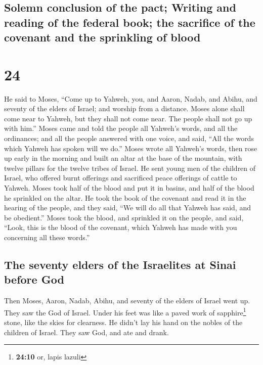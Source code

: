 \hypertarget{solemn-conclusion-of-the-pact-writing-and-reading-of-the-federal-book-the-sacrifice-of-the-covenant-and-the-sprinkling-of-blood}{%
\subsection{Solemn conclusion of the pact; Writing and reading of the
federal book; the sacrifice of the covenant and the sprinkling of
blood}\label{solemn-conclusion-of-the-pact-writing-and-reading-of-the-federal-book-the-sacrifice-of-the-covenant-and-the-sprinkling-of-blood}}

\hypertarget{section-23}{%
\section{24}\label{section-23}}

 He said to Moses, ``Come up to Yahweh, you, and Aaron,
Nadab, and Abihu, and seventy of the elders of Israel; and worship from
a distance.  Moses alone shall come near to Yahweh, but
they shall not come near. The people shall not go up with him.''
 Moses came and told the people all Yahweh's words, and
all the ordinances; and all the people answered with one voice, and
said, ``All the words which Yahweh has spoken will we do.''
 Moses wrote all Yahweh's words, then rose up early in the
morning and built an altar at the base of the mountain, with twelve
pillars for the twelve tribes of Israel.  He sent young
men of the children of Israel, who offered burnt offerings and
sacrificed peace offerings of cattle to Yahweh.  Moses
took half of the blood and put it in basins, and half of the blood he
sprinkled on the altar.  He took the book of the covenant
and read it in the hearing of the people, and they said, ``We will do
all that Yahweh has said, and be obedient.''  Moses took
the blood, and sprinkled it on the people, and said, ``Look, this is the
blood of the covenant, which Yahweh has made with you concerning all
these words.''

\hypertarget{the-seventy-elders-of-the-israelites-at-sinai-before-god}{%
\subsection{The seventy elders of the Israelites at Sinai before
God}\label{the-seventy-elders-of-the-israelites-at-sinai-before-god}}

 Then Moses, Aaron, Nadab, Abihu, and seventy of the
elders of Israel went up.  They saw the God of Israel.
Under his feet was like a paved work of sapphire\footnote{\textbf{24:10}
  or, lapis lazuli} stone, like the skies for clearness. 
He didn't lay his hand on the nobles of the children of Israel. They saw
God, and ate and drank.

